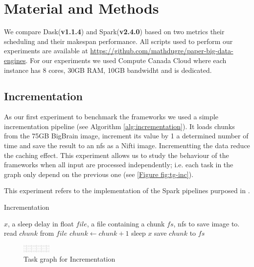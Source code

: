\documentclass[11pt,a4paper]{article}
\begin{document}
\section{Material and Methods}
We compare Dask(\textbf{v1.1.4}) and Spark(\textbf{v2.4.0}) based on two metrics
their scheduling and their makespan performance. All scripts used to perform our
experiments are available at
\href{https://github.com/mathdugre/paper-big-data-engines}{https://github.com/mathdugre/paper-big-data-engines}.
For our experiments we used Compute Canada Cloud where each instance has 8 cores,
30GB RAM, 10GB bandwidht and is dedicated.
 
\subsection{Incrementation} As our first experiment to benchmark the frameworks we
used a simple incrementation pipeline (see Algorithm \ref{alg:incrementation}). It
loads chunks from the 75GB BigBrain\citep{ds052:01} image, increment its value by 1 a
determined number of time and save the result to an nfs as a Nifti image.
Incrementting the data reduce the caching effect. This experiment allows us to study
the behaviour of the frameworks when all input are processed independently; i.e. each
task in the graph only depend on the previous one (see \ref{Figure fig:tg-inc}).

This experiment refers to the implementation of the Spark pipelines purposed in
\citet{Hayot-Sasson:17}.

\begin{algorithm}\caption{Incrementation}\label{alg:incrementation}
    \begin{algorithmic}
    \Require $x$, a sleep delay in float
    \Require $file$, a file containing a chunk
    \Require $fs$, nfs to save image to.
    \State read $chunk$ from $file$
        \State $chunk\gets chunk+1$
        \State sleep $x$
    \EndFor
    \EndFor
    \State save $chunk$ to $fs$
\end{algorithmic}
\end{algorithm}

\begin{figure}[ht]
    \centering
    \includegraphics[width=0.125\textwidth, angle=-90]{images/incrementation-task-graph.png}
    \caption{Task graph for Incrementation}
    \label{fig:tg-inc}
\end{figure}
\end{document}
